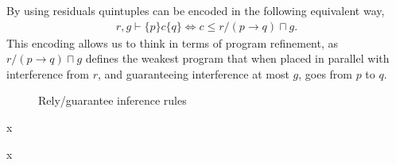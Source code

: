 \documentclass{llncs}
\begin{document}
By using residuals quintuples can be encoded in the following
equivalent way,
\begin{align}
r, g \vdash \{p\} c \{q\} \iff c \le r/(p \rightarrow q) \sqcap g \label{refine}.
\end{align}
This encoding allows us to think in terms of program
refinement, as $r/(p \rightarrow q) \sqcap g$ defines the weakest
program that when placed in parallel with interference from $r$, and
guaranteeing interference at most $g$, goes from $p$ to $q$.

\begin{figure}[tbh]
\centering
\begin{prooftree}
\end{prooftree}

\begin{prooftree}
\end{prooftree}

\begin{prooftree}
\end{prooftree}

\begin{prooftree}
\end{prooftree}

\begin{prooftree}
\end{prooftree}

\begin{prooftree}
\end{prooftree}
\caption{Rely/guarantee inference rules}
\label{fig:rgrules}
\end{figure}
x

x
\end{document}
